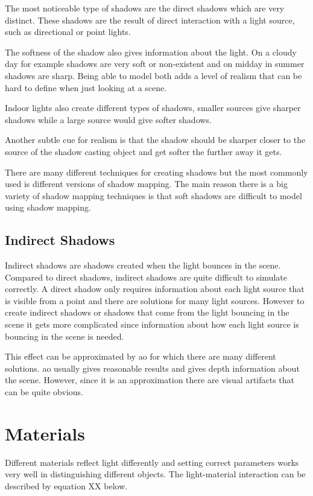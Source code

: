 The most noticeable type of shadows are the direct shadows which are very distinct. These shadows are the result of direct interaction with a light source, such as directional or point lights. 

The softness of the shadow also gives information about the light. On a cloudy day for example shadows are very soft or non-existent and on midday in summer shadows are sharp. Being able to model both adds a level of realism that can be hard to define when just looking at a scene.

Indoor lights also create different types of shadows, smaller sources give sharper shadows while a large source would give softer shadows. 

Another subtle cue for realism is that the shadow should be sharper closer to the source of the shadow casting object and get softer the further away it gets. 

There are many different techniques for creating shadows but the most commonly used is different versions of shadow mapping. The main reason there is a big variety of shadow mapping techniques is that soft shadows are difficult to model using shadow mapping.

\subsection{Indirect Shadows}

Indirect shadows are shadows created when the light bounces in the scene. Compared to direct shadows, indirect shadows are quite difficult to simulate correctly. A direct shadow only requires information about each light source that is visible from a point and there are solutions for many light sources. However to create indirect shadows or shadows that come from the light bouncing in the scene it gets more complicated since information about how each light source is bouncing in the scene is needed. 

This effect can be approximated by \gls{ao} for which there are many different solutions. \gls{ao} usually gives reasonable results and gives depth information about the scene. However, since it is an approximation there are visual artifacts that can be quite obvious.

\section{Materials}

Different materials reflect light differently and setting correct parameters works very well in distinguishing different objects. The light-material interaction can be described by equation XX below.

